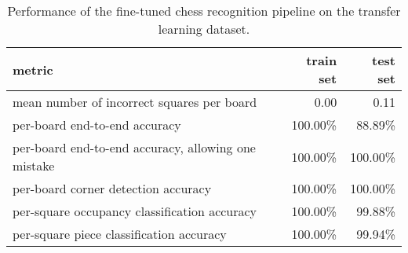\documentclass[../main.tex]{subfiles}
\begin{document}
\section{}

\begin{table}
    \centering
    \begin{tabular}{lrr}
        \toprule
        metric & train set & test set \\
        \midrule
        mean number of incorrect squares per board          & 0.00     & 0.11 \\
        per-board end-to-end accuracy                       & 100.00\% & 88.89\%   \\
        per-board end-to-end accuracy, allowing one mistake & 100.00\% & 100.00\%   \\
        per-board corner detection accuracy                 & 100.00\% & 100.00\% \\
        per-square occupancy classification accuracy        & 100.00\% & 99.88\% \\
        per-square piece classification accuracy            & 100.00\% & 99.94\% \\
        \bottomrule
    \end{tabular}
    \caption{Performance of the fine-tuned chess recognition pipeline on the transfer learning dataset.}
\end{table}
\end{document}
